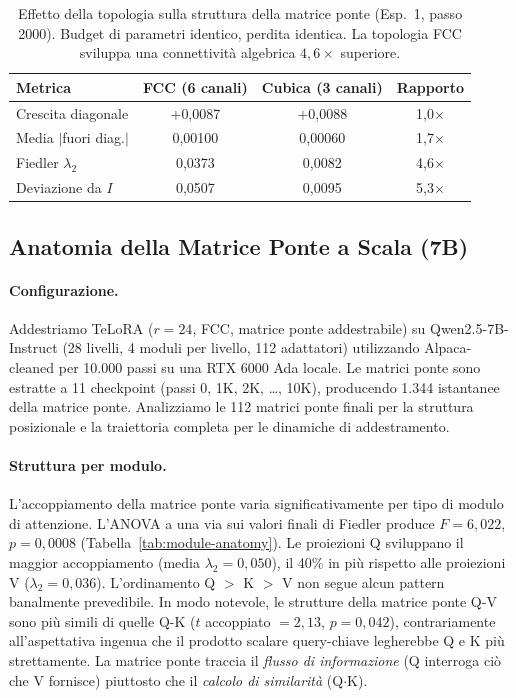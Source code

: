 \documentclass[11pt]{article}
\begin{document}
\begin{table}[t]
\centering
\caption{Effetto della topologia sulla struttura della matrice ponte
(Esp.\ 1, passo 2000). Budget di parametri identico, perdita identica.
La topologia FCC sviluppa una connettivit\`a algebrica $4{,}6\times$
superiore.}
\label{tab:topology-effect}
\small
\begin{tabular}{@{}lccc@{}}
\toprule
Metrica & FCC (6 canali) & Cubica (3 canali) & Rapporto \\
\midrule
Crescita diagonale         & $+$0,0087 & $+$0,0088 & 1,0$\times$ \\
Media $|$fuori diag.$|$ & 0,00100   & 0,00060   & 1,7$\times$ \\
Fiedler $\lambda_2$     & 0,0373    & 0,0082    & 4,6$\times$ \\
Deviazione da $I$      & 0,0507    & 0,0095    & 5,3$\times$ \\
\bottomrule
\end{tabular}
\end{table}

\subsection{Anatomia della Matrice Ponte a Scala (7B)}
\label{sec:exp-anatomy-7b}

\paragraph{Configurazione.} Addestriamo TeLoRA ($r\!=\!24$, FCC,
matrice ponte addestrabile) su Qwen2.5-7B-Instruct (28 livelli, 4
moduli per livello, 112 adattatori) utilizzando Alpaca-cleaned per
10.000 passi su una RTX 6000 Ada locale. Le matrici ponte sono estratte
a 11 checkpoint (passi 0, 1K, 2K, \ldots, 10K), producendo 1.344
istantanee della matrice ponte. Analizziamo le 112 matrici ponte finali
per la struttura posizionale e la traiettoria completa per le dinamiche
di addestramento.

\paragraph{Struttura per modulo.}
L'accoppiamento della matrice ponte varia significativamente per tipo di
modulo di attenzione. L'ANOVA a una via sui valori finali di Fiedler
produce $F = 6{,}022$, $p = 0{,}0008$
(Tabella~\ref{tab:module-anatomy}). Le proiezioni Q sviluppano il
maggior accoppiamento (media $\lambda_2 = 0{,}050$), il 40\% in pi\`u
rispetto alle proiezioni V ($\lambda_2 = 0{,}036$). L'ordinamento
Q $>$ K $>$ V non segue alcun pattern banalmente prevedibile.
In modo notevole, le strutture della matrice ponte Q-V sono pi\`u simili
di quelle Q-K ($t$ accoppiato $= 2{,}13$, $p = 0{,}042$), contrariamente
all'aspettativa ingenua che il prodotto scalare query-chiave legherebbe
Q e K pi\`u strettamente. La matrice ponte traccia il \emph{flusso di
informazione} (Q interroga ci\`o che V fornisce) piuttosto che il
\emph{calcolo di similarit\`a} (Q$\cdot$K).
\end{document}
